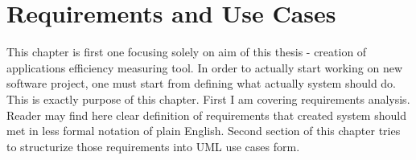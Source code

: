 %


\chapter{Requirements and Use Cases}
\label{cha:requirements}

\parbox{0.8\textwidth}{

{\small
This chapter is first one focusing solely on aim of this thesis - creation of applications efficiency measuring tool. In order to actually start working on new software project, one must start from defining what actually system should do. This is exactly purpose of this chapter. First I am covering requirements analysis. Reader may find here clear definition of requirements that created system should met in less formal notation of plain English. Second section of this chapter tries to structurize those requirements into UML use cases form. 
}
}












